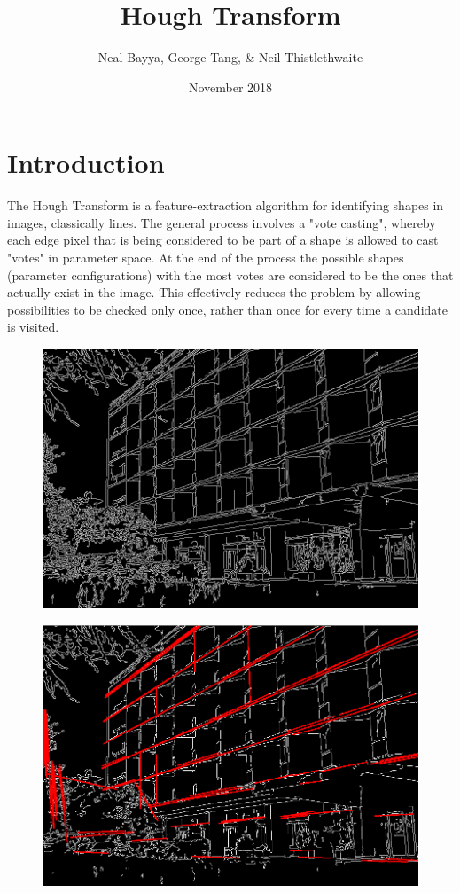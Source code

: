 \documentclass{article}
\title{Hough Transform}
\author{Neal Bayya, George Tang, \& Neil Thistlethwaite}
\date{November 2018}
\begin{document}
\maketitle

\section{Introduction}

The Hough Transform is a feature-extraction algorithm for identifying shapes in images, classically lines. The general process involves a "vote casting", whereby each edge pixel that is being considered to be part of a shape is allowed to cast "votes" in parameter space. At the end of the process the possible shapes (parameter configurations) with the most votes are considered to be the ones that actually exist in the image. This effectively reduces the problem by allowing possibilities to be checked only once, rather than once for every time a candidate is visited. 

\begin{figure}[!h]
\centering
\begin{minipage}{.5\textwidth}
  \centering
  \includegraphics[width=0.7\linewidth]{bld1}
  \label{fig:test1}
\end{minipage}%
\begin{minipage}{.5\textwidth}
  \centering
  \includegraphics[width=0.7\linewidth]{bld2}
  \label{fig:test2}
\end{minipage}
\end{figure}
\end{document}
